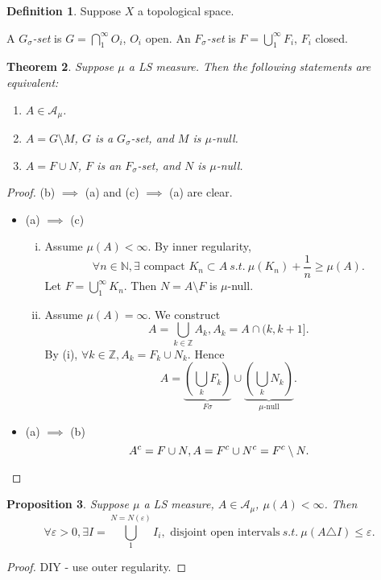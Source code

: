 \documentclass{report}
\newcommand{\Z}{\mathbb{Z}}
\newcommand{\N}{\mathbb{N}}
\newcommand{\st}{\ s.t.\ }
\newtheorem{theorem}{Theorem}[chapter]
\newtheorem{proposition}[theorem]{Proposition}
\theoremstyle{definition}
\newtheorem{definition}[theorem]{Definition}
\theoremstyle{remark}
\newcommand{\fnl}{\parbox[t]{0\linewidth}{}}
\begin{document}
\begin{definition}
	Suppose $X$ a topological space.

	A \emph{$G_\sigma$-set} is $\displaystyle G = \bigcap_1^\infty O_i$, $O_i$ open. 
	An \emph{$F_\sigma$-set} is $\displaystyle F = \bigcup_1^\infty F_i$, $F_i$ closed.
\end{definition}
\begin{theorem}
	Suppose $\mu$ a LS measure. Then the following statements are equivalent:
	\begin{enumerate}
		\item $A \in \mathcal{A}_\mu$.
		\item $A = G \setminus M$, $G$ is a $G_\sigma$-set, and $M$ is $\mu$-null.
		\item $A = F \cup N$, $F$ is an $F_\sigma$-set, and $N$ is $\mu$-null.
	\end{enumerate}
\end{theorem}
\begin{proof}
	(b) $\implies$ (a) and (c) $\implies$ (a) are clear.

	\begin{itemize}
		\item (a) $\implies$ (c) \fnl
		\begin{enumerate}[(i)]
			\item Assume $\mu(A) < \infty$. By inner regularity,
			\[
				\forall n \in \N, \exists \text{ compact } K_n \subset A \st \mu(K_n) + \frac{1}{n} \geq \mu(A).
			\]
			Let $F = \bigcup_1^\infty K_n$. Then $N = A \setminus F$ is $\mu$-null.
	
			\item 
			Assume $\mu(A) = \infty$.
			We construct
			\[
				A = \bigcup_{k \in \Z}A_k, A_k = A \cap (k, k+1].	
			\]
			By (i), $\forall k \in \Z, A_k = F_k \cup N_k$. Hence
			\[
				A = \underbrace{\left(\bigcup_k F_k\right)}_{F\sigma} \cup \underbrace{\left(\bigcup_k N_k\right)}_{\text{$\mu$-null}}.
			\]
		\end{enumerate}
		
		\item (a) $\implies$ (b)
		\[A^c = F \cup N, A = F^c \cup N^c = F^c \setminus N. \qedhere\]
	\end{itemize}
\end{proof}

\begin{proposition}
	Suppose $\mu$ a LS measure, $A \in \mathcal{A}_\mu$, $\mu(A) < \infty$. Then\[
		\forall \varepsilon > 0, \exists I = \bigcup_1^{N = N(\varepsilon)} I_i, \text{ disjoint open intervals} \st \mu(A \triangle I) \leq \varepsilon.	
	\]
\end{proposition}
\begin{proof}
	DIY - use outer regularity.
\end{proof}
\end{document}
